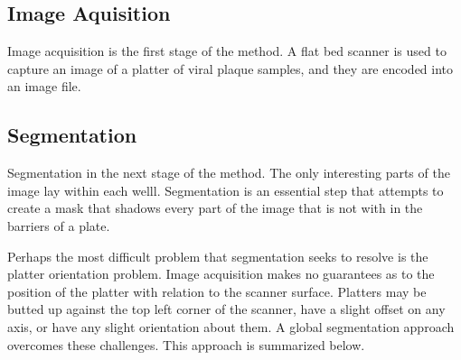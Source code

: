 \documentclass[11pt,final,twocolumn]{IEEEtran}
\begin{document}
\subsection{Image Aquisition}
Image acquisition  is the first stage of the method. A flat bed scanner is used to capture an image of a platter of viral plaque samples, and they are encoded into an image file. 

\subsection{Segmentation}
Segmentation in the next stage of the method. The only interesting parts of the image lay within each welll. Segmentation is an essential step that attempts to create a mask that shadows every part of the image that is not with in the barriers of a plate. 

Perhaps the most difficult problem that segmentation seeks to resolve is the platter orientation problem. Image acquisition makes no guarantees as to the position of the platter with relation to the scanner surface. Platters may be butted up against the top left corner of the scanner, have a slight offset on any axis, or have any slight orientation about them. A global segmentation approach overcomes these challenges. This approach is summarized below.
\end{document}
